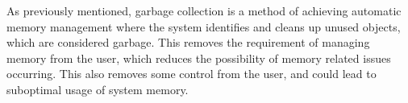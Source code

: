 As previously mentioned, garbage collection is a method of achieving automatic memory management where the system identifies and cleans up unused objects, which are considered garbage. This removes the requirement of managing memory from the user, which reduces the possibility of memory related issues occurring. This also removes some control from the user, and could lead to suboptimal usage of system memory.

